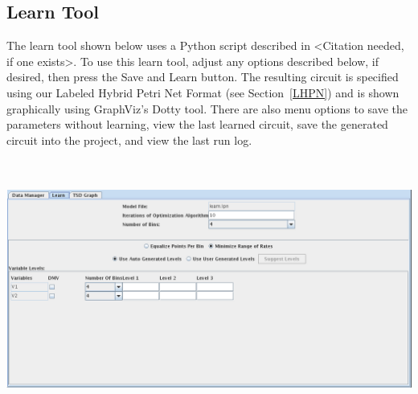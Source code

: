 \documentclass[titlepage,11pt]{article}
\begin{document}
\clearpage

\subsection{\label{learnTool}Learn Tool}

\noindent
The learn tool shown below uses a Python script described in <Citation needed,
if one exists>. To use this learn tool, adjust
any options described below, if desired, then press the Save and
Learn button. The resulting circuit is specified using
our Labeled Hybrid Petri Net Format (see Section~\ref{LHPN}) and is shown
graphically using GraphViz's Dotty tool.  There are also 
menu options to save the parameters without learning, view the last learned 
circuit, save the generated circuit into the project, and view the last run
log. 
\begin{center}
\includegraphics[height=85mm]{screenshots/learnLema}
\end{center}
\end{document}
